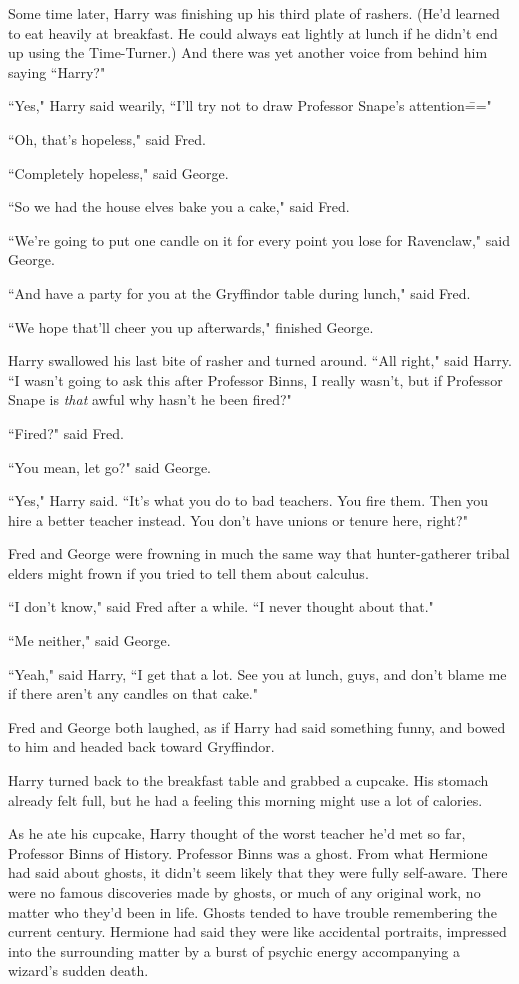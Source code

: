 Some time later, Harry was finishing up his third plate of rashers. (He'd learned to eat heavily at breakfast. He could always eat lightly at lunch if he didn't end up using the Time-Turner.) And there was yet another voice from behind him saying ``Harry?"

``Yes," Harry said wearily, ``I'll try not to draw Professor Snape's attention\==="

``Oh, that's hopeless," said Fred.

``Completely hopeless," said George.

``So we had the house elves bake you a cake," said Fred.

``We're going to put one candle on it for every point you lose for Ravenclaw," said George.

``And have a party for you at the Gryffindor table during lunch," said Fred.

``We hope that'll cheer you up afterwards," finished George.

Harry swallowed his last bite of rasher and turned around. ``All right," said Harry. ``I wasn't going to ask this after Professor Binns, I really wasn't, but if Professor Snape is \emph{that} awful why hasn't he been fired?"

``Fired?" said Fred.

``You mean, let go?" said George.

``Yes," Harry said. ``It's what you do to bad teachers. You fire them. Then you hire a better teacher instead. You don't have unions or tenure here, right?"

Fred and George were frowning in much the same way that hunter-gatherer tribal elders might frown if you tried to tell them about calculus.

``I don't know," said Fred after a while. ``I never thought about that."

``Me neither," said George.

``Yeah," said Harry, ``I get that a lot. See you at lunch, guys, and don't blame me if there aren't any candles on that cake."

Fred and George both laughed, as if Harry had said something funny, and bowed to him and headed back toward Gryffindor.

Harry turned back to the breakfast table and grabbed a cupcake. His stomach already felt full, but he had a feeling this morning might use a lot of calories.

As he ate his cupcake, Harry thought of the worst teacher he'd met so far, Professor Binns of History. Professor Binns was a ghost. From what Hermione had said about ghosts, it didn't seem likely that they were fully self-aware. There were no famous discoveries made by ghosts, or much of any original work, no matter who they'd been in life. Ghosts tended to have trouble remembering the current century. Hermione had said they were like accidental portraits, impressed into the surrounding matter by a burst of psychic energy accompanying a wizard's sudden death.

